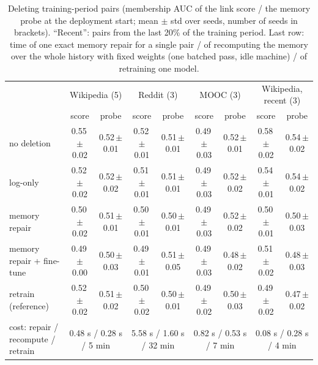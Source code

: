 \begin{table}[t]
\centering\scriptsize
\caption{Deleting training-period pairs (membership AUC of the link score / the memory probe at the deployment start; mean
$\pm$ std over seeds, number of seeds in brackets). ``Recent'': pairs from the last 20\% of the training period. Last row:
time of one exact memory repair for a single pair / of recomputing the memory over the whole history with fixed weights
(one batched pass, idle machine) / of retraining one model.}
\label{tab:traindel}
\setlength{\tabcolsep}{3pt}
\begin{tabular}{@{}lcccccccc@{}}
\toprule
 & \multicolumn{2}{c}{Wikipedia (5)} & \multicolumn{2}{c}{Reddit (3)} & \multicolumn{2}{c}{MOOC (3)} & \multicolumn{2}{c}{Wikipedia, recent (3)} \\
 & score & probe & score & probe & score & probe & score & probe \\
\midrule
no deletion & 0.55\,{\scriptsize$\pm$0.02} & 0.52\,{\scriptsize$\pm$0.01} & 0.52\,{\scriptsize$\pm$0.01} & 0.51\,{\scriptsize$\pm$0.01} & 0.49\,{\scriptsize$\pm$0.03} & 0.52\,{\scriptsize$\pm$0.01} & 0.58\,{\scriptsize$\pm$0.02} & 0.54\,{\scriptsize$\pm$0.02} \\
log-only & 0.52\,{\scriptsize$\pm$0.02} & 0.52\,{\scriptsize$\pm$0.02} & 0.51\,{\scriptsize$\pm$0.01} & 0.51\,{\scriptsize$\pm$0.01} & 0.49\,{\scriptsize$\pm$0.03} & 0.52\,{\scriptsize$\pm$0.02} & 0.54\,{\scriptsize$\pm$0.01} & 0.54\,{\scriptsize$\pm$0.02} \\
memory repair & 0.50\,{\scriptsize$\pm$0.02} & 0.51\,{\scriptsize$\pm$0.01} & 0.50\,{\scriptsize$\pm$0.01} & 0.50\,{\scriptsize$\pm$0.01} & 0.49\,{\scriptsize$\pm$0.03} & 0.52\,{\scriptsize$\pm$0.02} & 0.50\,{\scriptsize$\pm$0.01} & 0.50\,{\scriptsize$\pm$0.03} \\
memory repair + fine-tune & 0.49\,{\scriptsize$\pm$0.00} & 0.50\,{\scriptsize$\pm$0.03} & 0.49\,{\scriptsize$\pm$0.01} & 0.51\,{\scriptsize$\pm$0.05} & 0.49\,{\scriptsize$\pm$0.03} & 0.48\,{\scriptsize$\pm$0.02} & 0.51\,{\scriptsize$\pm$0.02} & 0.48\,{\scriptsize$\pm$0.03} \\
retrain (reference) & 0.52\,{\scriptsize$\pm$0.02} & 0.51\,{\scriptsize$\pm$0.02} & 0.50\,{\scriptsize$\pm$0.02} & 0.50\,{\scriptsize$\pm$0.01} & 0.49\,{\scriptsize$\pm$0.02} & 0.50\,{\scriptsize$\pm$0.03} & 0.49\,{\scriptsize$\pm$0.02} & 0.47\,{\scriptsize$\pm$0.02} \\
\midrule
cost: repair / recompute / retrain & \multicolumn{2}{c}{0.48 s / 0.28 s / 5 min} & \multicolumn{2}{c}{5.58 s / 1.60 s / 32 min} & \multicolumn{2}{c}{0.82 s / 0.53 s / 7 min} & \multicolumn{2}{c}{0.08 s / 0.28 s / 4 min} \\
\bottomrule
\end{tabular}
\end{table}

